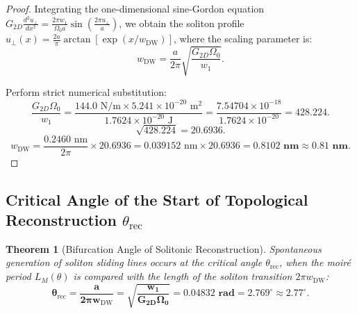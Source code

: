 \documentclass[12pt,a4paper]{article}
\newtheorem{theorem}{Theorem}
\begin{document}
			\begin{proof}
				Integrating the one-dimensional sine-Gordon equation $G_{2D} \frac{d^2 u_\perp}{dx^2} = \frac{2\pi w_1}{\Omega_0 a} \sin\left(\frac{2\pi u_\perp}{a}\right)$, we obtain the soliton profile $u_\perp(x) = \frac{2a}{\pi} \arctan[\exp(x/w_{\text{DW}})]$, where the scaling parameter is:
				\begin{equation}
					w_{\text{DW}} = \frac{a}{2\pi} \sqrt{\frac{G_{2D} \Omega_0}{w_1}}.
				\end{equation}
				
				Perform strict numerical substitution:
				\begin{equation}
					\frac{G_{2D} \Omega_0}{w_1} = \frac{144.0\text{ N/m} \times 5.241 \times 10^{-20}\text{ m}^2}{1.7624 \times 10^{-20}\text{ J}} = \frac{7.54704 \times 10^{-18}}{1.7624 \times 10^{-20}} = \mathbf{428.224}.
				\end{equation}
				\begin{equation}
					\sqrt{428.224} = \mathbf{20.6936}.
				\end{equation}
				\begin{equation}
					w_{\text{DW}} = \frac{0.2460\text{ nm}}{2\pi} \times 20.6936 = 0.039152\text{ nm} \times 20.6936 = \mathbf{0.8102\text{ nm}} \approx \mathbf{0.81\text{ nm}}.
				\end{equation}
			\end{proof}
			
			\subsection{Critical Angle of the Start of Topological Reconstruction $\theta_{\text{rec}}$}
			\begin{theorem}[Bifurcation Angle of Solitonic Reconstruction]
				Spontaneous generation of soliton sliding lines occurs at the critical angle $\theta_{\mathrm{rec}}$, when the moiré period $L_M(\theta)$ is compared with the length of the soliton transition $2\pi w_{\mathrm{DW}}$:
				\begin{equation}
					\mathbf{\theta_{\mathrm{rec}} = \frac{a}{2\pi w_{\mathrm{DW}}} = \sqrt{\frac{w_1}{G_{2D} \Omega_0}} = \mathbf{0.04832\text{ rad}} = \mathbf{2.769^\circ \approx 2.77^\circ}}.
					\end{equation}
				\end{theorem}
				
\end{document}
